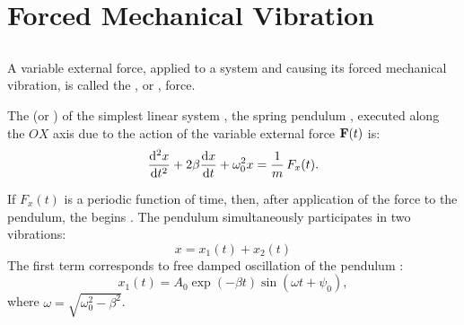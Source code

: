 \section{Forced Mechanical Vibration}
\label{sec-29.2} 



\subsection{}\label{29.2.1} A variable external force, applied to a system and causing its forced mechanical vibration, is called the , or , force.

The  (or ) of the simplest linear system , the spring pendulum , executed along the $OX$ axis due to the action of the variable external force $\vb{F} (t)$ is:
\begin{equation*}%
\dv[2]{x}{t} + 2\beta \dv{x}{t} + \omega_{0}^{2} x = \frac{1}{m} \, F_{x}(t).
\end{equation*}

If $F_{x} (t)$ is a periodic function of time, then, after application of the force to the pendulum, the  begins . The pendulum simultaneously participates in two vibrations:
\begin{equation*}%
x = x_{1}(t) + x_{2}(t)
\end{equation*}
The first term corresponds to free damped oscillation of the pendulum :
\begin{equation*}%
x_{1}(t) = A_{0} \exp(- \beta t) \sin (\omega t + \psi_{0}),
\end{equation*}
where $\omega = \sqrt{\omega_{0}^{2} - \beta^{2}}$.

